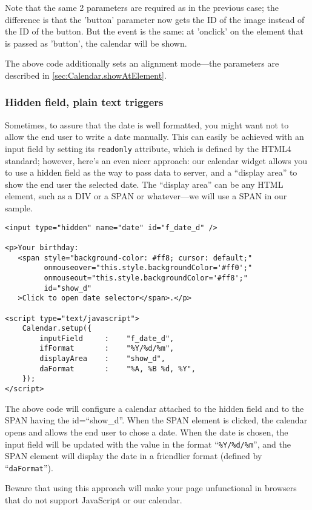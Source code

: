 \documentclass[a4paper,twoside,10pt]{dynadoc}
\begin{document}
Note that the same 2 parameters are required as in the previous case; the
difference is that the 'button' parameter now gets the ID of the image
instead of the ID of the button.  But the event is the same: at 'onclick' on
the element that is passed as 'button', the calendar will be shown.

The above code additionally sets an alignment mode---the parameters are
described in \ref{sec:Calendar.showAtElement}.

\subsubsection{Hidden field, plain text triggers}

Sometimes, to assure that the date is well formatted, you might want not to
allow the end user to write a date manually.  This can easily be achieved
with an input field by setting its \texttt{readonly} attribute, which is
defined by the HTML4 standard; however, here's an even nicer approach: our
calendar widget allows you to use a hidden field as the way to pass data to
server, and a “display area” to show the end user the selected date.  The
“display area” can be any HTML element, such as a DIV or a SPAN or
whatever---we will use a SPAN in our sample.

\begin{verbatim}
<input type="hidden" name="date" id="f_date_d" />

<p>Your birthday:
   <span style="background-color: #ff8; cursor: default;"
         onmouseover="this.style.backgroundColor='#ff0';"
         onmouseout="this.style.backgroundColor='#ff8';"
         id="show_d"
   >Click to open date selector</span>.</p>

<script type="text/javascript">
    Calendar.setup({
        inputField     :    "f_date_d",
        ifFormat       :    "%Y/%d/%m",
        displayArea    :    "show_d",
        daFormat       :    "%A, %B %d, %Y",
    });
</script>
\end{verbatim}

The above code will configure a calendar attached to the hidden field and to
the SPAN having the id=“show\_d”.  When the SPAN element is clicked, the
calendar opens and allows the end user to chose a date.  When the date is
chosen, the input field will be updated with the value in the format
“\texttt{\%Y/\%d/\%m}”, and the SPAN element will display the date in a
friendlier format (defined by “\texttt{daFormat}”).

Beware that using this approach will make your page unfunctional in browsers
that do not support JavaScript or our calendar.
\end{document}
